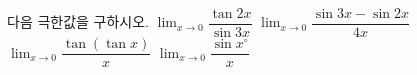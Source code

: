 다음 극한값을 구하시오.
 $\displaystyle\lim_{x\to 0}\dfrac{\tan 2x}{\sin 3x}$
 $\displaystyle\lim_{x\to 0}\dfrac{\sin 3x-\sin 2x}{4x}$
 $\displaystyle\lim_{x\to 0}\dfrac{\tan(\tan x)}{x}$
 $\displaystyle\lim_{x\to 0}\dfrac{\sin x^\circ}{x}$
